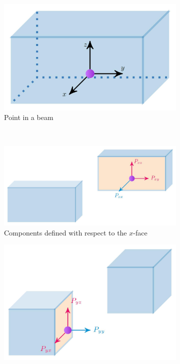 \documentclass[a4paper]{article}
\begin{document}
\begin{itemize}
\begin{itemize}
\begin{figure}[h!]
    \begin{subfigure}[b]{0.3\linewidth}
        \includegraphics[width=\linewidth]{Images/Stress_Tensor_Images/stress1.jpg}
            \caption{Point in a beam}
        \end{subfigure}
        \\
        \begin{subfigure}[b]{0.3\linewidth}
            \includegraphics[width=\linewidth]{Images/Stress_Tensor_Images/stress2.jpg}
            \caption{Components defined with respect to the $x$-face}
        \end{subfigure}
        \begin{subfigure}[b]{0.3\linewidth}
            \includegraphics[width=\linewidth]{Images/Stress_Tensor_Images/stress3.jpg}

\end{subfigure}
\end{figure}
\end{itemize}
\end{itemize}
\end{document}
